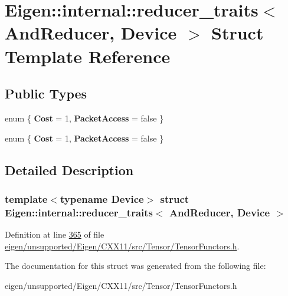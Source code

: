 \hypertarget{struct_eigen_1_1internal_1_1reducer__traits_3_01_and_reducer_00_01_device_01_4}{}\section{Eigen\+:\+:internal\+:\+:reducer\+\_\+traits$<$ And\+Reducer, Device $>$ Struct Template Reference}
\label{struct_eigen_1_1internal_1_1reducer__traits_3_01_and_reducer_00_01_device_01_4}
\subsection*{Public Types}
\begin{DoxyCompactItemize}
\item 
\mbox{\label{struct_eigen_1_1internal_1_1reducer__traits_3_01_and_reducer_00_01_device_01_4_abe0fdea3feac3d653e571ce4548d114b}} 
enum \{ {\bfseries Cost} = 1, 
{\bfseries Packet\+Access} = false
 \}
\item 
\mbox{\label{struct_eigen_1_1internal_1_1reducer__traits_3_01_and_reducer_00_01_device_01_4_a822c111ddee3c5f0204e34938bbf395b}} 
enum \{ {\bfseries Cost} = 1, 
{\bfseries Packet\+Access} = false
 \}
\end{DoxyCompactItemize}


\subsection{Detailed Description}
\subsubsection*{template$<$typename Device$>$\newline
struct Eigen\+::internal\+::reducer\+\_\+traits$<$ And\+Reducer, Device $>$}



Definition at line \hyperlink{eigen_2unsupported_2_eigen_2_c_x_x11_2src_2_tensor_2_tensor_functors_8h_source_l00365}{365} of file \hyperlink{eigen_2unsupported_2_eigen_2_c_x_x11_2src_2_tensor_2_tensor_functors_8h_source}{eigen/unsupported/\+Eigen/\+C\+X\+X11/src/\+Tensor/\+Tensor\+Functors.\+h}.



The documentation for this struct was generated from the following file\+:\begin{DoxyCompactItemize}
\item 
eigen/unsupported/\+Eigen/\+C\+X\+X11/src/\+Tensor/\+Tensor\+Functors.\+h\end{DoxyCompactItemize}
